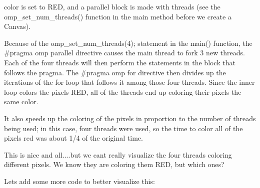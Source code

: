{\ttfamily color} is set to {\ttfamily R\+ED}, and a parallel block is made with {} threads (see the {\ttfamily omp\+\_\+set\+\_\+num\+\_\+threads()} function in the main method before we create a Canvas).

Because of the {\ttfamily omp\+\_\+set\+\_\+num\+\_\+threads(4);} statement in the {\ttfamily main()} function, the {\ttfamily \#pragma omp parallel} directive causes the main thread to fork 3 new threads. Each of the four threads will then perform the statements in the block that follows the {\ttfamily pragma}. The {\ttfamily \#pragma omp for} directive then divides up the iterations of the {\ttfamily for} loop that follows it among those four threads. Since the inner loop colors the pixels {\ttfamily R\+ED}, all of the threads end up coloring their pixels the same color.

It also speeds up the coloring of the pixels in proportion to the number of threads being used; in this case, four threads were used, so the time to color all of the pixels red was about 1/4 of the original time.

This is nice and all....but we can\textquotesingle{}t really visualize the four threads coloring different pixels. We know they are coloring them {\ttfamily R\+ED}, but which ones?

Let\textquotesingle{}s add some more code to better visualize this\+:


